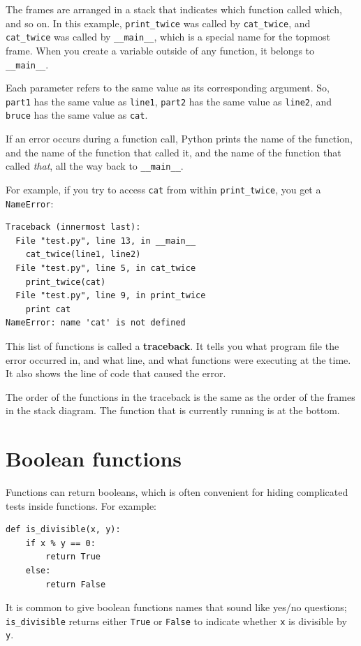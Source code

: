 \documentclass[10pt]{book}
\begin{document}
The frames are arranged in a stack that indicates which function
called which, and so on.  In this example, \verb"print_twice"
was called by \verb"cat_twice", and \verb"cat_twice" was called by 
\verb"__main__", which is a special name for the topmost frame.  When
you create a variable outside of any function, it belongs to 
\verb"__main__".

Each parameter refers to the same value as its corresponding
argument.  So, {\tt part1} has the same value as
{\tt line1}, {\tt part2} has the same value as {\tt line2},
and {\tt bruce} has the same value as {\tt cat}.

If an error occurs during a function call, Python prints the
name of the function, and the name of the function that called
it, and the name of the function that called {\em that}, all the
way back to \verb"__main__".

For example, if you try to access {\tt cat} from within 
\verb"print_twice", you get a {\tt NameError}:

\beforeverb
\begin{verbatim}
Traceback (innermost last):
  File "test.py", line 13, in __main__
    cat_twice(line1, line2)
  File "test.py", line 5, in cat_twice
    print_twice(cat)
  File "test.py", line 9, in print_twice
    print cat
NameError: name 'cat' is not defined
\end{verbatim}
\afterverb
%
This list of functions is called a {\bf traceback}.  It tells you what
program file the error occurred in, and what line, and what functions
were executing at the time.  It also shows the line of code that
caused the error.


The order of the functions in the traceback is the same as the
order of the frames in the stack diagram.  The function that is
currently running is at the bottom.


\section{Boolean functions}
\label{boolean}


Functions can return booleans, which is often convenient for hiding
complicated tests inside functions.  For example:

\beforeverb
\begin{verbatim}
def is_divisible(x, y):
    if x % y == 0:
        return True
    else:
        return False
\end{verbatim}
\afterverb
%
It is common to give boolean functions names that sound like yes/no
questions; \verb"is_divisible" returns either {\tt True} or {\tt False}
to indicate whether {\tt x} is divisible by {\tt y}.
\end{document}
